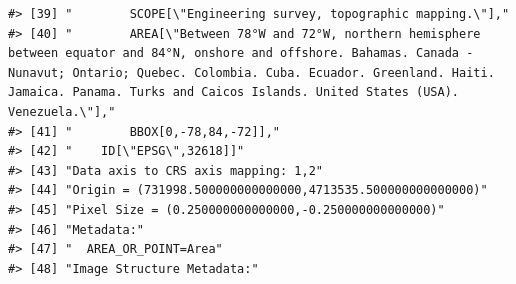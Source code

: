 \documentclass[
]{book}
\begin{document}
\begin{verbatim}
#> [39] "        SCOPE[\"Engineering survey, topographic mapping.\"],"                                                                                                                                                                                                                   
#> [40] "        AREA[\"Between 78°W and 72°W, northern hemisphere between equator and 84°N, onshore and offshore. Bahamas. Canada - Nunavut; Ontario; Quebec. Colombia. Cuba. Ecuador. Greenland. Haiti. Jamaica. Panama. Turks and Caicos Islands. United States (USA). Venezuela.\"],"
#> [41] "        BBOX[0,-78,84,-72]],"                                                                                                                                                                                                                                                   
#> [42] "    ID[\"EPSG\",32618]]"                                                                                                                                                                                                                                                        
#> [43] "Data axis to CRS axis mapping: 1,2"                                                                                                                                                                                                                                             
#> [44] "Origin = (731998.500000000000000,4713535.500000000000000)"                                                                                                                                                                                                                      
#> [45] "Pixel Size = (0.250000000000000,-0.250000000000000)"                                                                                                                                                                                                                            
#> [46] "Metadata:"                                                                                                                                                                                                                                                                      
#> [47] "  AREA_OR_POINT=Area"                                                                                                                                                                                                                                                           
#> [48] "Image Structure Metadata:"                                                                                                                                                                                                                                                      

\end{verbatim}
\end{document}
